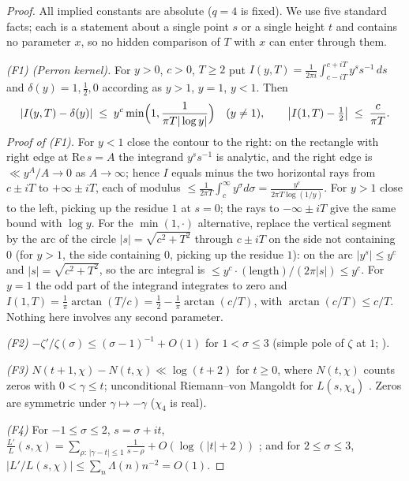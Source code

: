 \begin{proof}
All implied constants are absolute ($q=4$ is fixed). We use five
standard facts; each is a statement about a single point $s$ or a single
height $t$ and contains no parameter $x$, so no hidden comparison of $T$
with $x$ can enter through them.

\emph{(F1) (Perron kernel).} For $y>0$, $c>0$, $T\ge2$ put
$I(y,T)=\frac{1}{2\pi i}\int_{c-iT}^{c+iT}y^s s^{-1}\,ds$ and
$\delta(y)=1,\tfrac12,0$ according as $y>1$, $y=1$, $y<1$. Then
\[
|I(y,T)-\delta(y)|\;\le\;y^{c}\min\Bigl(1,\frac{1}{\pi T|\log y|}\Bigr)
\quad(y\ne1),\qquad
\bigl|I(1,T)-\tfrac12\bigr|\;\le\;\frac{c}{\pi T}.
\]
\emph{Proof of (F1).} For $y<1$ close the contour to the right: on the
rectangle with right edge at $\mathrm{Re}\,s=A$ the integrand
$y^ss^{-1}$ is analytic, and the right edge is $\ll y^A/A\to0$ as
$A\to\infty$; hence $I$ equals minus the two horizontal rays from
$c\pm iT$ to $+\infty\pm iT$, each of modulus
$\le\frac{1}{2\pi T}\int_c^\infty y^\sigma d\sigma
=\frac{y^c}{2\pi T\log(1/y)}$. For $y>1$ close to the left, picking up
the residue $1$ at $s=0$; the rays to $-\infty\pm iT$ give the same
bound with $\log y$. For the $\min(1,\cdot)$ alternative, replace the
vertical segment by the arc of the circle $|s|=\sqrt{c^2+T^2}$ through
$c\pm iT$ on the side not containing $0$ (for $y>1$, the side
containing $0$, picking up the residue $1$): on the arc
$|y^s|\le y^{c}$ and $|s|=\sqrt{c^2+T^2}$, so the arc integral is
$\le y^c\cdot(\text{length})/(2\pi|s|)\le y^{c}$. For $y=1$ the odd
part of the integrand integrates to zero and
$I(1,T)=\frac1\pi\arctan(T/c)=\tfrac12-\frac1\pi\arctan(c/T)$, with
$\arctan(c/T)\le c/T$. Nothing here involves any second parameter.

\emph{(F2)} $-\zeta'/\zeta(\sigma)\le(\sigma-1)^{-1}+O(1)$ for
$1<\sigma\le3$ (simple pole of $\zeta$ at $1$; \cite[\S17]{Dav00}).

\emph{(F3)} $N(t+1,\chi)-N(t,\chi)\ll\log(t+2)$ for $t\ge0$, where
$N(t,\chi)$ counts zeros with $0<\gamma\le t$; unconditional
Riemann--von Mangoldt for $L(s,\chi_4)$ \cite[\S16]{Dav00}. Zeros are
symmetric under $\gamma\mapsto-\gamma$ ($\chi_4$ is real).

\emph{(F4)} For $-1\le\sigma\le2$, $s=\sigma+it$,
$\frac{L'}{L}(s,\chi)=\sum_{\rho:\,|\gamma-t|\le1}\frac{1}{s-\rho}
+O(\log(|t|+2))$ \cite[\S16]{Dav00}; and for $2\le\sigma\le3$,
$|L'/L(s,\chi)|\le\sum_n\Lambda(n)n^{-2}=O(1)$.


\end{proof}
